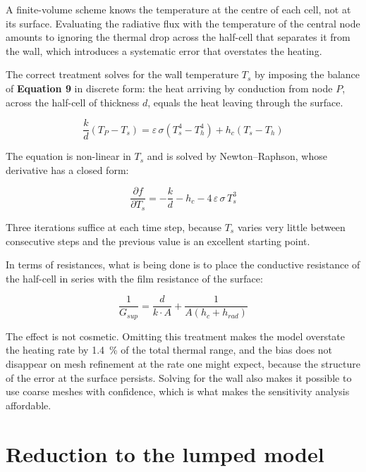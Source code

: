 \documentclass[11pt,a4paper]{article}
\newcommand{\ecu}[1]{\textbf{\textcolor{uji}{Equation #1}}}
\begin{document}
A finite-volume scheme knows the temperature at the centre of each cell, not
at its surface. Evaluating the radiative flux with the temperature of the
central node amounts to ignoring the thermal drop across the half-cell that
separates it from the wall, which introduces a systematic error that
overstates the heating.

The correct treatment solves for the wall temperature $T_{s}$ by imposing
the balance of \ecu{9} in discrete form: the heat arriving by conduction
from node $P$, across the half-cell of thickness $d$, equals the heat
leaving through the surface.

\begin{equation}
\frac{k}{d} \left( T_{P} - T_{s} \right)
= \varepsilon\, \sigma \left( T_{s}^{4} - T_{h}^{4} \right)
+ h_{c} \left( T_{s} - T_{h} \right)
\end{equation}

The equation is non-linear in $T_{s}$ and is solved by Newton--Raphson,
whose derivative has a closed form:

\begin{equation}
\frac{\partial f}{\partial T_{s}}
= -\frac{k}{d} - h_{c} - 4\, \varepsilon\, \sigma\, T_{s}^{3}
\end{equation}

Three iterations suffice at each time step, because $T_{s}$ varies very
little between consecutive steps and the previous value is an excellent
starting point.

In terms of resistances, what is being done is to place the conductive
resistance of the half-cell in series with the film resistance of the
surface:

\begin{equation}
\frac{1}{G_{sup}} = \frac{d}{k \cdot A}
+ \frac{1}{A \left( h_{c} + h_{rad} \right)}
\end{equation}

The effect is not cosmetic. Omitting this treatment makes the model
overstate the heating rate by \SI{1.4}{\percent} of the total thermal
range, and the bias does not disappear on mesh refinement at the rate one
might expect, because the structure of the error at the surface persists.
Solving for the wall also makes it possible to use coarse meshes with
confidence, which is what makes the sensitivity analysis affordable.

\section{Reduction to the lumped model}
\label{sec:agrupado}
\end{document}
